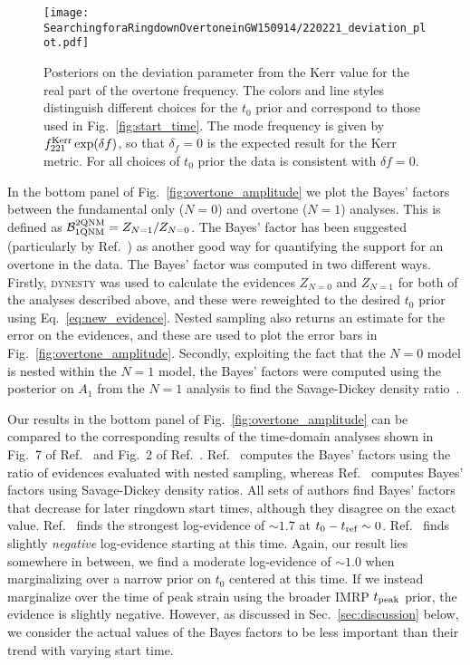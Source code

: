 \begin{figure}[t]
	\texttt{[image: SearchingforaRingdownOvertoneinGW150914/220221\_deviation\_plot.pdf]}
	\caption[Posteriors on the deviation from the Kerr for the real part of the GW150914 overtone frequency]{ 
		Posteriors on the deviation parameter from the Kerr value for the real part of the overtone frequency.
		The colors and line styles distinguish different choices for the $t_0$ prior and correspond to those used in Fig.~\ref{fig:start_time}.
		The mode frequency is given by $f_{221}^{\rm Kerr} \exp(\delta f)$, so that $\delta_f=0$ is the expected result for the Kerr metric.
		For all choices of $t_0$ prior the data is consistent with $\delta f=0$.
	}
	\label{fig:delta_f}
\end{figure}

In the bottom panel of Fig.~\ref{fig:overtone_amplitude} we plot the Bayes' factors between the fundamental only ($N=0$) and overtone ($N=1$) analyses.
This is defined as $\mathcal{B}_{\rm 1QNM}^{\rm 2QNM}=Z_{N=1}/Z_{N=0}$.
The Bayes' factor has been suggested (particularly by Ref.~\cite{Cotesta:2022pci}) as another good way for quantifying the support for an overtone in the data.
The Bayes' factor was computed in two different ways.
Firstly, \textsc{dynesty} was used to calculate the evidences $Z_{N=0}$ and $Z_{N=1}$ for both of the analyses described above, and these were reweighted to the desired $t_0$ prior using Eq.~\ref{eq:new_evidence}. 
Nested sampling also returns an estimate for the error on the evidences, and these are used to plot the error bars in Fig.~\ref{fig:overtone_amplitude}.
Secondly, exploiting the fact that the $N=0$ model is nested within the $N=1$ model, the Bayes' factors were computed using the posterior on $A_1$ from the $N=1$ analysis to find the Savage-Dickey density ratio~\cite{Dickey:1971}. 

Our results in the bottom panel of Fig.~\ref{fig:overtone_amplitude} can be compared to the corresponding results of the time-domain analyses shown in Fig.~7 of Ref.~\cite{Isi:2022mhy} and Fig.~2 of Ref.~\cite{Cotesta:2022pci}.
Ref.~\cite{Cotesta:2022pci} computes the Bayes' factors using the ratio of evidences evaluated with nested sampling, whereas Ref.~\cite{Isi:2022mhy} computes Bayes' factors using Savage-Dickey density ratios.
All sets of authors find Bayes' factors that decrease for later ringdown start times, although they disagree on the exact value.
Ref.~\cite{Isi:2022mhy} finds the strongest log-evidence of $\sim 1.7$ at $t_0-t_{\rm ref} \sim 0$.
Ref.~\cite{Cotesta:2022pci} finds slightly \emph{negative} log-evidence starting at this time.
Again, our result lies somewhere in between, we find a moderate log-evidence of $\sim 1.0$ when marginalizing over a narrow prior on $t_0$ centered at this time.
If we instead marginalize over the time of peak strain using the broader IMRP $t_{\rm peak}$ prior, the evidence is slightly negative.
However, as discussed in Sec.~\ref{sec:discussion} below, we consider the actual values of the Bayes factors to be less important than their trend with varying start time.

